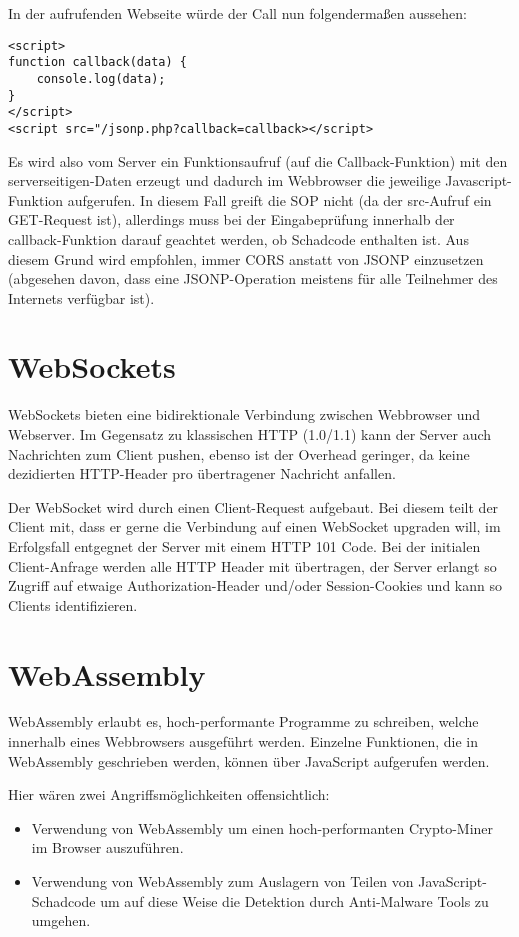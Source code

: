 In der aufrufenden Webseite würde der Call nun folgendermaßen aussehen:

\begin{verbatim}
<script>
function callback(data) {
	console.log(data);
}
</script>
<script src="/jsonp.php?callback=callback></script>
\end{verbatim}

Es wird also vom Server ein Funktionsaufruf (auf die Callback-Funktion) mit den serverseitigen-Daten erzeugt und dadurch im Webbrowser die jeweilige Javascript-Funktion aufgerufen. In diesem Fall greift die SOP nicht (da der src-Aufruf ein GET-Request ist), allerdings muss bei der Eingabeprüfung innerhalb der callback-Funktion darauf geachtet werden, ob Schadcode enthalten ist. Aus diesem Grund wird empfohlen, immer CORS anstatt von JSONP einzusetzen (abgesehen davon, dass eine JSONP-Operation meistens für alle Teilnehmer des Internets verfügbar ist).

\section{WebSockets} 

WebSockets bieten eine bidirektionale Verbindung zwischen Webbrowser und Webserver. Im Gegensatz zu klassischen HTTP (1.0/1.1) kann der Server auch Nachrichten zum Client pushen, ebenso ist der Overhead geringer, da keine dezidierten HTTP-Header pro übertragener Nachricht anfallen.

Der WebSocket wird durch einen Client-Request aufgebaut. Bei diesem teilt der Client mit, dass er gerne die Verbindung auf einen WebSocket upgraden will, im Erfolgsfall entgegnet der Server mit einem HTTP 101 Code. Bei der initialen Client-Anfrage werden alle HTTP Header mit übertragen, der Server erlangt so Zugriff auf etwaige Authorization-Header und/oder Session-Cookies und kann so Clients identifizieren.

\section{WebAssembly}

WebAssembly erlaubt es, hoch-performante Programme zu schreiben, welche innerhalb eines Webbrowsers ausgeführt werden. Einzelne Funktionen, die in WebAssembly geschrieben werden, können über JavaScript aufgerufen werden.

Hier wären zwei Angriffsmöglichkeiten offensichtlich:

\begin{itemize}
	\item Verwendung von WebAssembly um einen hoch-performanten Crypto-Miner im Browser auszuführen.
	\item Verwendung von WebAssembly zum Auslagern von Teilen von JavaScript-Schadcode um auf diese Weise die Detektion durch Anti-Malware Tools zu umgehen.
\end{itemize}

